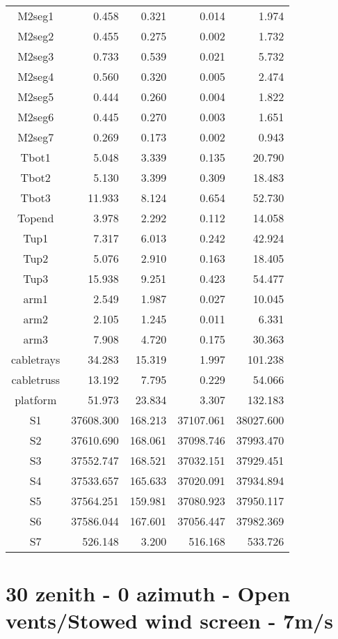 \begin{longtable}{crrrr}
 M2seg1 & 0.458 & 0.321 & 0.014 & 1.974 \\
 M2seg2 & 0.455 & 0.275 & 0.002 & 1.732 \\
 M2seg3 & 0.733 & 0.539 & 0.021 & 5.732 \\
 M2seg4 & 0.560 & 0.320 & 0.005 & 2.474 \\
 M2seg5 & 0.444 & 0.260 & 0.004 & 1.822 \\
 M2seg6 & 0.445 & 0.270 & 0.003 & 1.651 \\
 M2seg7 & 0.269 & 0.173 & 0.002 & 0.943 \\
 Tbot1 & 5.048 & 3.339 & 0.135 & 20.790 \\
 Tbot2 & 5.130 & 3.399 & 0.309 & 18.483 \\
 Tbot3 & 11.933 & 8.124 & 0.654 & 52.730 \\
 Topend & 3.978 & 2.292 & 0.112 & 14.058 \\
 Tup1 & 7.317 & 6.013 & 0.242 & 42.924 \\
 Tup2 & 5.076 & 2.910 & 0.163 & 18.405 \\
 Tup3 & 15.938 & 9.251 & 0.423 & 54.477 \\
 arm1 & 2.549 & 1.987 & 0.027 & 10.045 \\
 arm2 & 2.105 & 1.245 & 0.011 & 6.331 \\
 arm3 & 7.908 & 4.720 & 0.175 & 30.363 \\
 cabletrays & 34.283 & 15.319 & 1.997 & 101.238 \\
 cabletruss & 13.192 & 7.795 & 0.229 & 54.066 \\
 platform & 51.973 & 23.834 & 3.307 & 132.183 \\
 S1 & 37608.300 & 168.213 & 37107.061 & 38027.600 \\
 S2 & 37610.690 & 168.061 & 37098.746 & 37993.470 \\
 S3 & 37552.747 & 168.521 & 37032.151 & 37929.451 \\
 S4 & 37533.657 & 165.633 & 37020.091 & 37934.894 \\
 S5 & 37564.251 & 159.981 & 37080.923 & 37950.117 \\
 S6 & 37586.044 & 167.601 & 37056.447 & 37982.369 \\
 S7 & 526.148 & 3.200 & 516.168 & 533.726 \\
\bottomrule
\end{longtable}




\section{30 zenith - 0 azimuth - Open vents/Stowed wind screen - 7m/s}
\label{zen30az000_OS7}

